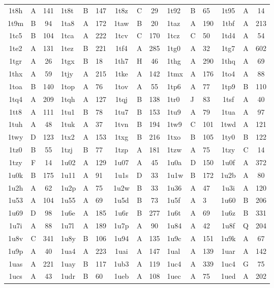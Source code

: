 \begin{longtable}{|c|c|c| a|a|a| c|c|c| a|a|a| c|c|c|}
1t8h & A & 141 & 1t8t & B & 147 & 1t8z & C & 29 & 1t92 & B & 65 & 1t95 & A & 14\\
1t9m & B & 94 & 1ta8 & A & 172 & 1taw & B & 20 & 1taz & A & 190 & 1tbf & A & 213\\
1tc5 & B & 104 & 1tca & A & 222 & 1tcv & C & 170 & 1tcz & C & 50 & 1td4 & A & 54\\
1te2 & A & 131 & 1tez & B & 221 & 1tf4 & A & 285 & 1tg0 & A & 32 & 1tg7 & A & 602\\
1tgr & A & 26 & 1tgx & B & 18 & 1th7 & H & 46 & 1thg & A & 290 & 1thq & A & 69\\
1thx & A & 59 & 1tjy & A & 215 & 1tke & A & 142 & 1tmx & A & 176 & 1to4 & A & 88\\
1toa & B & 140 & 1top & A & 76 & 1tov & A & 55 & 1tp6 & A & 77 & 1tp9 & B & 110\\
1tq4 & A & 209 & 1tqh & A & 127 & 1tqj & B & 138 & 1tr0 & J & 83 & 1tsf & A & 40\\
1tt8 & A & 111 & 1tu1 & B & 78 & 1tu7 & B & 153 & 1tu9 & A & 79 & 1tua & A & 97\\
1tuh & A & 48 & 1tuk & A & 37 & 1tvn & B & 194 & 1tw9 & C & 101 & 1twd & A & 121\\
1twy & D & 123 & 1tx2 & A & 153 & 1txg & B & 216 & 1txo & B & 105 & 1ty0 & B & 122\\
1tz0 & B & 55 & 1tzj & B & 77 & 1tzp & A & 181 & 1tzw & A & 75 & 1tzy & C & 14\\
1tzy & F & 14 & 1u02 & A & 129 & 1u07 & A & 45 & 1u0a & D & 150 & 1u0f & A & 372\\
1u0k & B & 175 & 1u11 & A & 91 & 1u1s & D & 33 & 1u1w & B & 172 & 1u2b & A & 80\\
1u2h & A & 62 & 1u2p & A & 75 & 1u2w & B & 33 & 1u36 & A & 47 & 1u3i & A & 120\\
1u53 & A & 104 & 1u55 & A & 69 & 1u5d & B & 73 & 1u5f & A & 3 & 1u60 & B & 206\\
1u69 & D & 98 & 1u6e & A & 185 & 1u6r & B & 277 & 1u6t & A & 69 & 1u6z & B & 331\\
1u7i & A & 88 & 1u7l & A & 189 & 1u7p & A & 90 & 1u84 & A & 42 & 1u8f & Q & 204\\
1u8v & C & 341 & 1u8y & B & 106 & 1u94 & A & 135 & 1u9c & A & 151 & 1u9k & A & 67\\
1u9p & A & 40 & 1ua4 & A & 223 & 1uai & A & 147 & 1ual & A & 139 & 1uar & A & 142\\
1uas & A & 221 & 1uay & B & 117 & 1ub3 & A & 119 & 1uc4 & A & 339 & 1uc4 & G & 75\\
1ucs & A & 43 & 1udr & B & 60 & 1ueb & A & 108 & 1uec & A & 75 & 1ued & A & 202\\

\end{longtable}
